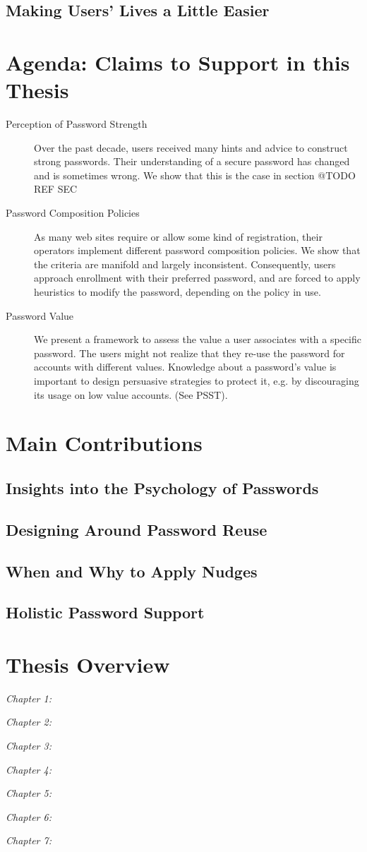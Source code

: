 \subsection{Making Users' Lives a Little Easier}

\section{Agenda: Claims to Support in this Thesis}

\begin{description}
\item[Perception of Password Strength] Over the past decade, users received many hints and advice to construct strong passwords. Their understanding of a secure password has changed and is sometimes wrong. We show that this is the case in section @TODO REF SEC

\item[Password Composition Policies] As many web sites require or allow some kind of registration, their operators implement different password composition policies. We show that the criteria are manifold and largely inconsistent. Consequently, users approach enrollment with their preferred password, and are forced to apply heuristics to modify the password, depending on the policy in use. 

\item[Password Value] We present a framework to assess the value a user associates with a specific password. The users might not realize that they re-use the password for accounts with different values. Knowledge about a password's value is important to design persuasive strategies to protect it, e.g. by discouraging its usage on low value accounts. (See PSST).
\end{description}


\section{Main Contributions}
\subsection{Insights into the Psychology of Passwords}
\subsection{Designing Around Password Reuse}
\subsection{When and Why to Apply Nudges}
\subsection{Holistic Password Support}


\section{Thesis Overview}
\textit{Chapter 1:}

\textit{Chapter 2:}

\textit{Chapter 3:}

\textit{Chapter 4:}

\textit{Chapter 5:}

\textit{Chapter 6:}

\textit{Chapter 7:}




